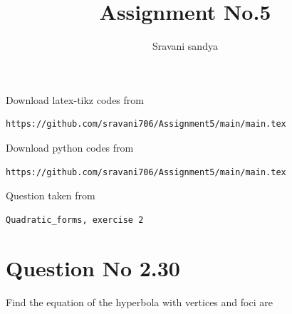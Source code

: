 \documentclass[journal,12pt,twocolumn]{IEEEtran}
\begin{document}
\makeatother
\let\StandardTheFigure\thefigure
\let\vec\mathbf
\renewcommand{\thefigure}{\theproblem}
\def\putbox#1#2#3{\makebox[0in][l]{\makebox[#1][l]{}\raisebox{\baselineskip}[0in][0in]{\raisebox{#2}[0in][0in]{#3}}}}
     \def\rightbox#1{\makebox[0in][r]{#1}}
     \def\centbox#1{\makebox[0in]{#1}}
     \def\topbox#1{\raisebox{-\baselineskip}[0in][0in]{#1}}
     \def\midbox#1{\raisebox{-0.5\baselineskip}[0in][0in]{#1}}
\vspace{3cm}
\title{Assignment No.5}
\author{Sravani sandya}
\maketitle
\newpage
\bigskip
\renewcommand{\thefigure}{\theenumi}
\renewcommand{\thetable}{\theenumi}
Download latex-tikz codes from
\begin{lstlisting}
https://github.com/sravani706/Assignment5/main/main.tex
\end{lstlisting}
%
Download python codes from
\begin{lstlisting}
https://github.com/sravani706/Assignment5/main/main.tex
\end{lstlisting}
%
Question taken from
\begin{lstlisting}
Quadratic_forms, exercise 2
\end{lstlisting}
\section{Question No 2.30}
Find the equation of the hyperbola with vertices
  and foci are 
\end{document}
